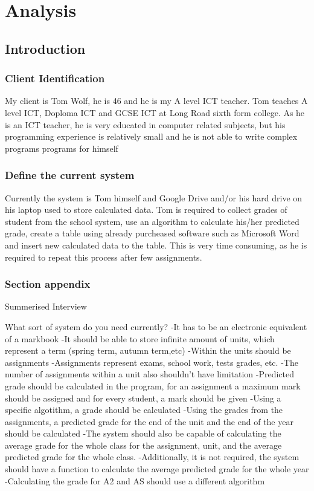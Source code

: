 \chapter{Analysis}

\section{Introduction}

\subsection{Client Identification} 
My client is Tom Wolf, he is 46 and he is my A level ICT teacher. Tom teaches A level ICT, Doploma ICT and GCSE ICT at Long Road sixth form college. As he is an ICT teacher, he is very educated in computer related subjects, but his programming experience is relatively small and he is not able to write complex programs programs for himself

\subsection{Define the current system} 
Currently the system is Tom himself and Google Drive and/or his hard drive on his laptop used to store calculated data. Tom is required to collect grades of student from the school system, use an algorithm to calculate his/her predicted grade, create a table using already purcheased software such as Microsoft Word and  insert new calculated data to the table. This is very time consuming, as he is required to repeat this process after few assignments.

\subsection{Section appendix}

Summerised Interview

What sort of system do you need currently?
-It has to be an electronic equivalent of a markbook
-It should be able to store infinite amount of units, which represent a term (spring term, autumn term,etc)
-Within the units should be assignments
-Assignments represent exams, school work, tests grades, etc.
-The number of assignments within a unit also shouldn't have limitation
-Predicted grade should be calculated in the program, for an assignment a maximum mark should be assigned and for every student, a mark should be given
-Using a specific algotithm, a grade should be calculated
-Using the grades from the assignments, a predicted grade for the end of the unit and the end of the year should be calculated
-The system should also be capable of calculating the average grade for the whole class for the assignment, unit, and the average predicted grade for the whole class.
-Additionally, it is not required, the system should have a function to calculate the average predicted grade for the whole year
-Calculating the grade for A2 and AS should use a different algorithm

